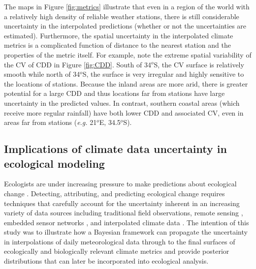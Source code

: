 \documentclass[12pt]{article}
\begin{document}
The maps in Figure \ref{fig:metrics} illustrate that even in a region
of the world with a relatively high density of reliable weather
stations, there is still considerable uncertainty in the interpolated
predictions (whether or not the uncertainties are estimated).
Furthermore, the spatial uncertainty in the interpolated climate metrics is a
complicated function of distance to the nearest station and the
properties of the metric itself.  For example, note the extreme spatial variability of the CV of CDD in Figure
\ref{fig:CDD}.  South of 34$^o$S, the CV surface is relatively
smooth while north of 34$^o$S, the surface is very irregular and
highly sensitive to the locations of stations.  Because the inland
areas are more arid, there is greater potential for a large CDD and
thus locations far from stations have large uncertainty in the
predicted values.  
In contrast, southern coastal areas (which receive more regular rainfall)
have both lower CDD and associated CV, even in areas far from
stations (\textit{e.g.} 21$^o$E, 34.5$^o$S).


\subsection{Implications of climate data uncertainty in
  ecological modeling}
Ecologists are under increasing pressure to make predictions about
ecological change \citep{clark_ecological_2001}.
Detecting, attributing, and predicting ecological change requires techniques
that carefully account for the uncertainty inherent in an increasing variety
of data sources including traditional field observations, remote
sensing \citep{muraoka_satellite_2009}, embedded sensor networks
\citep{collins_new_2006,clark_inferential_2011}, and interpolated climate data
\citep{soria-auza_impact_2010,roubicek_does_2010}. 
The intention of this study was to illustrate how a
Bayesian framework can propagate the uncertainty in
interpolations of daily meteorological data through to the final
surfaces of ecologically and biologically relevant climate metrics and provide
posterior distributions that can later be incorporated into ecological analysis.  
\end{document}
